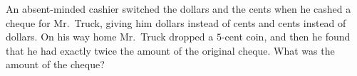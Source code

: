 An absent-minded cashier switched the dollars and the cents when he cashed a cheque for Mr.\ Truck, giving him dollars instead of cents and cents instead of dollars. On his way home Mr.\ Truck dropped a $5$-cent coin, and then he found that he had exactly twice the amount of the original cheque. What was the amount of the cheque?
